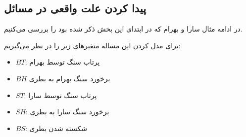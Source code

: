 \subsection{پیدا کردن علت واقعی در مسائل}

در ادامه مثال سارا و بهرام که در ابتدای این بخش ذکر شده بود را بررسی می‌کنیم.

برای مدل کردن این مساله متغیر‌های زیر را در نظر می‌گیریم:
\begin{itemize}
      \item $BT$:
            پرتاب سنگ توسط بهرام
      \item $BH$
            برخورد سنگ بهرام به بطری
      \item $ST$:
            پرتاب سنگ توسط سارا
      \item $SH$:
            برخورد سنگ سارا به بطری
      \item $BS$:
            شکسته شدن بطری
\end{itemize}

